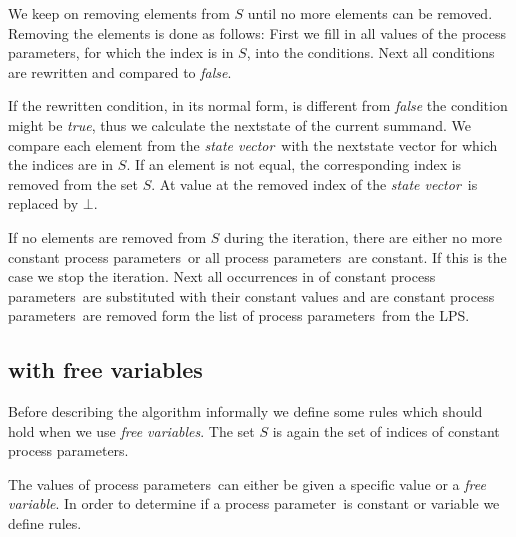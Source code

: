 \index{}\documentclass[a4paper,10pt]{article}
\theoremstyle{plain}
\theoremstyle{definition}
\newcommand{\pp}{process parameter}
\newcommand{\pps}{process parameters}
\newcommand{\ti}{\textit}
\newcommand{\sv}{\textit{state vector}}
\begin{document}
We keep on removing elements from $S$ until no more elements can be removed. Removing the elements is done as follows:
First we fill in all values of the \pps , for which the index is in $S$, into the conditions. Next all conditions are rewritten and compared to \ti{false}.

If the rewritten condition, in its normal form, is different from \ti{false} the condition might be \ti{true}, thus we calculate the nextstate of the current summand.  We compare each element from the \sv\ with the nextstate vector for which the indices are in $S$. If an element is not equal, the corresponding index is removed from the set $S$.
At value at the removed index of the \sv\ is replaced by $\bot$.

If no elements are removed from $S$ during the iteration, there are either no more constant \pps\ or all \pps\ are constant. If this is the case we stop the iteration. Next all occurrences in of constant \pps\ are substituted with their constant values and are constant \pps\ are removed form the list of \pps\ from the LPS.

\subsection{with free variables}
Before describing the algorithm informally we define some rules which should hold when we use \ti{free variables}. The set  $S$ is again the set of indices of constant \pps .

The values of \pps\ can either be given a specific value or a \ti{free variable}. In order to determine if a \pp\ is constant or variable we define rules.
\end{document}
